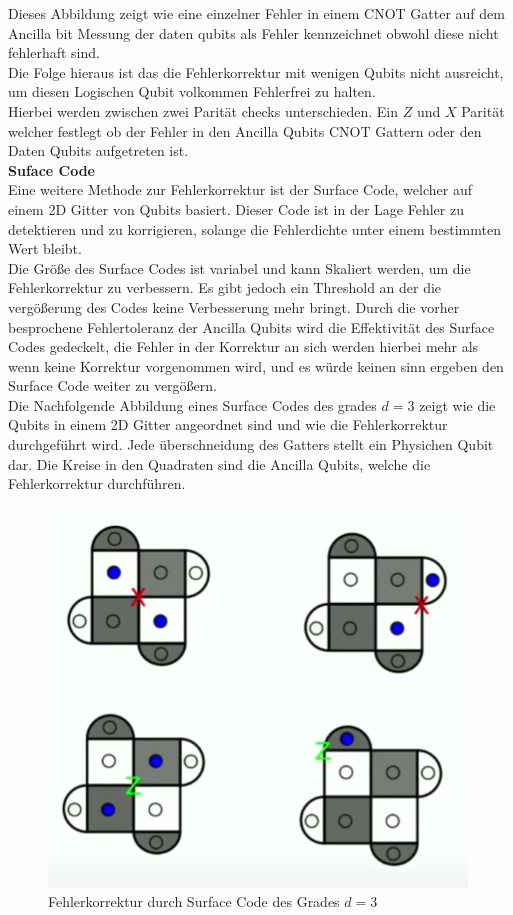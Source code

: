 Dieses Abbildung zeigt wie eine einzelner Fehler in einem CNOT Gatter auf dem Ancilla bit Messung der daten qubits als Fehler kennzeichnet obwohl diese nicht fehlerhaft sind.\\
Die Folge hieraus ist das die Fehlerkorrektur mit wenigen Qubits nicht ausreicht, um diesen Logischen Qubit volkommen Fehlerfrei zu halten.\\

Hierbei werden zwischen zwei Parität checks unterschieden. Ein $Z$ und $X$ Parität welcher festlegt ob der Fehler in den Ancilla Qubits CNOT Gattern oder den Daten Qubits aufgetreten ist.\\

\textbf{Suface Code}\\
Eine weitere Methode zur Fehlerkorrektur ist der Surface Code, welcher auf einem 2D Gitter von Qubits basiert.
Dieser Code ist in der Lage Fehler zu detektieren und zu korrigieren, solange die Fehlerdichte unter einem bestimmten Wert bleibt.\\

Die Größe des Surface Codes ist variabel und kann Skaliert werden, um die Fehlerkorrektur zu verbessern.
Es gibt jedoch ein Threshold an der die vergößerung des Codes keine Verbesserung mehr bringt.
Durch die vorher besprochene Fehlertoleranz der Ancilla Qubits wird die Effektivität des Surface Codes gedeckelt, die Fehler in der Korrektur an sich werden hierbei mehr als wenn keine Korrektur vorgenommen wird, und es würde keinen sinn ergeben den Surface Code weiter zu vergößern.\\

Die Nachfolgende Abbildung eines Surface Codes des grades $d=3$ zeigt wie die Qubits in einem 2D Gitter angeordnet sind und wie die Fehlerkorrektur durchgeführt wird.
Jede überschneidung des Gatters stellt ein Physichen Qubit dar. Die Kreise in den Quadraten sind die Ancilla Qubits, welche die Fehlerkorrektur durchführen.\\

\begin{figure}[H]
    \centering
    \includegraphics[width=0.6\linewidth]{img/Errors.png}
    \caption{Fehlerkorrektur durch Surface Code des Grades $d=3$}
    \label{fig:Surface-Code}
\end{figure}

